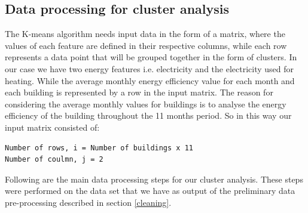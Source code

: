 \subsection{Data processing for cluster analysis}
The K-means algorithm needs input data in the form of a matrix, where the values of each feature are defined in their respective columns, while each row represents a data point that will be grouped together in the form of clusters. In our case we have two energy features i.e. electricity and the electricity used for heating. While the average monthly energy efficiency value for each month and each building is represented by a row in the input matrix. The reason for considering the average monthly values for buildings is to analyse the energy efficiency of the building throughout the 11 months period. So in this way our input matrix consisted of: 
\begin{lstlisting}
Number of rows, i = Number of buildings x 11 
Number of coulmn, j = 2
\end{lstlisting}
Following are the main data processing steps for our cluster analysis. These steps were performed on the data set that we have as output of the preliminary data pre-processing described in section \ref{cleaning}.
